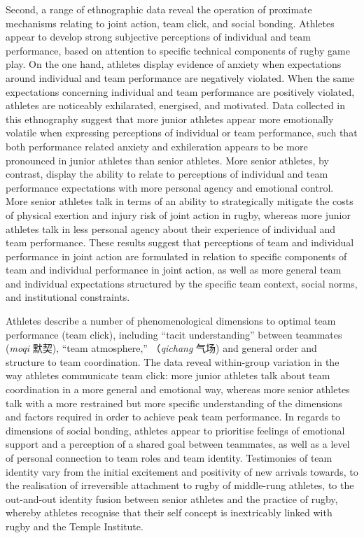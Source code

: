 Second, a range of ethnographic data reveal the operation of proximate mechanisms relating to joint action, team click, and social bonding.
Athletes appear to develop strong subjective perceptions of individual and team performance, based on attention to specific technical components of rugby game play.   On the one hand, athletes display evidence of anxiety when expectations around individual and team performance are negatively violated.  When the same expectations concerning individual and team performance are positively violated, athletes are noticeably exhilarated, energised, and motivated.  Data collected in this ethnography suggest that more junior athletes appear more emotionally volatile when expressing perceptions of individual or team performance, such that both performance related anxiety and exhileration appears to be more pronounced in junior athletes than senior athletes.  More senior athletes, by contrast, display the ability to relate to perceptions of individual and team performance expectations with more personal agency and emotional control.  More senior athletes talk in terms of an ability to strategically mitigate the costs of physical exertion and injury risk of joint action in rugby, whereas more junior athletes talk in less personal agency about their experience of individual and team performance.  These results suggest that perceptions of team and individual performance in joint action are formulated in relation to specific components of team and individual performance in joint action, as well as more general team and individual expectations structured by the specific team context, social norms, and institutional constraints.

Athletes describe a number of phenomenological dimensions to optimal team performance (team click), including ``tacit understanding'' between teammates (\textit{moqi} 默契), ``team atmosphere,'' （\textit{qichang} 气场) and general order and structure to team coordination.  The data reveal within-group variation in the way athletes communicate team click: more junior athletes talk about team coordination in a more general and emotional way, whereas more senior athletes talk with a more restrained but more specific understanding of the dimensions and factors required in order to achieve peak team performance.  In regards to dimensions of social bonding, athletes appear to prioritise feelings of emotional support and a perception of a shared goal between teammates, as well as a level of personal connection to team roles and team identity.  Testimonies of team identity vary from the initial excitement and positivity of new arrivals towards, to the realisation of irreversible attachment to rugby of middle-rung athletes, to the out-and-out identity fusion between senior athletes and the practice of rugby, whereby athletes recognise that their self concept is inextricably linked with rugby and the Temple Institute.


